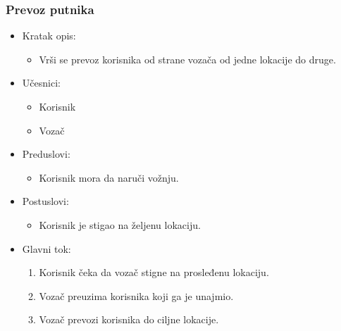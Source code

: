 \subsubsection{\bfseries Prevoz putnika}
\begin{itemize}
	\item Kratak opis:
		\begin{itemize}
			\item Vrši se prevoz korisnika od strane vozača od jedne lokacije do druge.
		\end{itemize}
 
	\item Učesnici:
		\begin{itemize}
		    \item Korisnik
		    \item Vozač
		\end{itemize}				

	\item Preduslovi:
		\begin{itemize}
		    \item Korisnik mora da naruči vožnju.
		\end{itemize}

	\item Postuslovi:
		\begin{itemize}
			\item Korisnik je stigao na željenu lokaciju.
		\end{itemize}		


	\item Glavni tok:
		\begin{enumerate}
		    \item Korisnik čeka da vozač stigne na prosleđenu lokaciju.
		    \item Vozač preuzima korisnika koji ga je unajmio.  
		    \item Vozač prevozi korisnika do ciljne lokacije.
		\end{enumerate}
\end{itemize}

